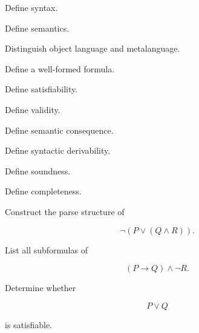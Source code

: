 \begin{exercise}[1]
Define syntax.
\end{exercise}

\begin{exercise}[1]
Define semantics.
\end{exercise}

\begin{exercise}[1]
Distinguish object language and metalanguage.
\end{exercise}

\begin{exercise}[1]
Define a well-formed formula.
\end{exercise}

\begin{exercise}[1]
Define satisfiability.
\end{exercise}

\begin{exercise}[1]
Define validity.
\end{exercise}

\begin{exercise}[1]
Define semantic consequence.
\end{exercise}

\begin{exercise}[1]
Define syntactic derivability.
\end{exercise}

\begin{exercise}[1]
Define soundness.
\end{exercise}

\begin{exercise}[1]
Define completeness.
\end{exercise}

\begin{exercise}[2]
Construct the parse structure of

\[
\neg(P\lor(Q\land R)).
\]
\end{exercise}

\begin{exercise}[2]
List all subformulas of

\[
(P\rightarrow Q)\land\neg R.
\]
\end{exercise}

\begin{exercise}[2]
Determine whether

\[
P\lor Q
\]

is satisfiable.
\end{exercise}

